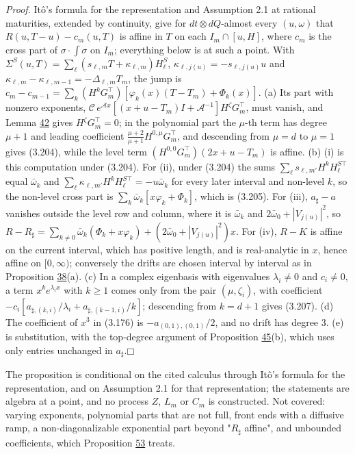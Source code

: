 \documentclass[11pt]{article}
\providecommand{\square}{\mdlgwhtsquare}
\begin{document}
\emph{Proof.} Itô's formula for the representation and Assumption 2.1 at rational maturities, extended by continuity, give for \(dt\otimes dQ\)-almost every \((u,\omega)\) that \(R(u,T-u)-c_m(u,T)\) is affine in \(T\) on each \(I_m\cap[u,H]\), where \(c_m\) is the cross part of \(\sigma\cdot\int\sigma\) on \(I_m\); everything below is at such a point. With \(\Sigma^S(u,T)=\sum_\ell(s_{\ell,m}T+\kappa_{\ell,m})H^S_\ell\), \(\kappa_{\ell,j(u)}=-s_{\ell,j(u)}u\) and \(\kappa_{\ell,m}-\kappa_{\ell,m-1}=-\Delta_{\ell,m}T_m\), the jump is \(c_m-c_{m-1}=\sum_k(H^kG_m^\top)[\varphi_k(x)(T-T_m)+\Phi_k(x)]\). (a) Its part with nonzero exponents, \(\mathcal C\,e^{\mathcal Ax}[(x+u-T_m)I+\mathcal A^{-1}]H^\zeta G_m^\top\), must vanish, and Lemma \hyperref[res:Lemma-42]{42} gives \(H^\zeta G_m^\top=0\); in the polynomial part the \(\mu\)-th term has degree \(\mu+1\) and leading coefficient \(\frac{\mu+2}{\mu+1}H^{0,\mu}G_m^\top\), and descending from \(\mu=d\) to \(\mu=1\) gives (3.204), while the level term \((H^{0,0}G_m^\top)(2x+u-T_m)\) is affine. (b) (i) is this computation under (3.204). For (ii), under (3.204) the sums \(\sum_\ell s_{\ell,m'}H^kH^{S\top}_\ell\) equal \(\bar\omega_k\) and \(\sum_\ell\kappa_{\ell,m'}H^kH^{S\top}_\ell=-u\bar\omega_k\) for every later interval and non-level \(k\), so the non-level cross part is \(\sum_k\bar\omega_k[x\varphi_k+\Phi_k]\), which is (3.205). For (iii), \(a_\sharp-a\) vanishes outside the level row and column, where it is \(\bar\omega_k\) and \(2\bar\omega_0+|V_{j(u)}|^2\), so \(R-R_\sharp=\sum_{k\neq0}\bar\omega_k(\Phi_k+x\varphi_k)+(2\bar\omega_0+|V_{j(u)}|^2)x\). For (iv), \(R-K\) is affine on the current interval, which has positive length, and is real-analytic in \(x\), hence affine on \([0,\infty)\); conversely the drifts are chosen interval by interval as in Proposition \hyperref[res:Proposition-38]{38}(a). (c) In a complex eigenbasis with eigenvalues \(\lambda_i\neq0\) and \(c_i\neq0\), a term \(x^ke^{\lambda_ix}\) with \(k\ge1\) comes only from the pair \((\mu,\zeta_i)\), with coefficient \(-c_i[a_{\sharp,(k,i)}/\lambda_i+a_{\sharp,(k-1,i)}/k]\); descending from \(k=d+1\) gives (3.207). (d) The coefficient of \(x^3\) in (3.176) is \(-a_{(0,1),(0,1)}/2\), and no drift has degree 3. (e) is substitution, with the top-degree argument of Proposition \hyperref[res:Proposition-45]{45}(b), which uses only entries unchanged in \(a_\sharp\).\hfill$\square$

The proposition is conditional on the cited calculus through Itô's formula for the representation, and on Assumption 2.1 for that representation; the statements are algebra at a point, and no process \(Z\), \(L_m\) or \(C_m\) is constructed. Not covered: varying exponents, polynomial parts that are not full, front ends with a diffusive ramp, a non-diagonalizable exponential part beyond "\(R_\sharp\) affine", and unbounded coefficients, which Proposition \hyperref[res:Proposition-53]{53} treats.
\end{document}
